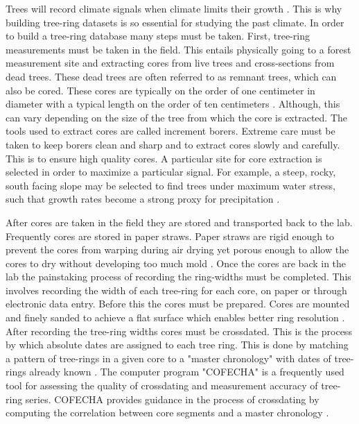 \documentclass[phd,tocprelim]{cornell}
\begin{document}

Trees will record climate signals when climate limits their 
growth \cite{fritts1976}. This is why building tree-ring datasets 
is so essential for studying the past climate. In order to build 
a tree-ring database many steps must be taken. First, tree-ring 
measurements must be taken in the field. This entails physically 
going to a forest measurement site and extracting cores from live 
trees and cross-sections from dead trees. These dead trees are often 
referred to as remnant trees, which can also be cored. These cores are 
typically on the order of one centimeter in diameter with a typical 
length on the order of ten centimeters \cite{vroblesky2008user}. 
Although, this can vary depending on the size of the tree from which 
the core is extracted. The tools used to extract cores are called 
increment borers. Extreme care must be taken to keep borers clean and 
sharp and to extract cores slowly and carefully. This is to ensure high 
quality cores. A particular site for core extraction is selected in 
order to maximize a particular signal. For example, a steep, rocky, 
south facing slope may be selected to find trees under maximum water 
stress, such that growth rates become a strong proxy for precipitation 
\cite{grissino1997,cook2013methods}. 

\par
After cores are taken in the field they are stored and transported 
back to the lab. Frequently cores are stored in paper straws. Paper 
straws are rigid enough to prevent the cores from warping during air 
drying yet porous enough to allow the cores to dry without developing 
too much mold \cite{phipps1985collecting}. Once the cores are back in 
the lab the painstaking process of recording the ring-widths must be 
completed. This involves recording the width of each tree-ring for 
each core, on paper or through electronic data entry. Before this the 
cores must be prepared. Cores are mounted and finely sanded to achieve 
a flat surface which enables better ring resolution 
\cite{phipps1985collecting}.
After recording the tree-ring widths cores must be crossdated. This 
is the process by which absolute dates are assigned to each tree ring. 
This is done by matching a pattern of tree-rings in a given core to a 
"master chronology" with dates of tree-rings already known 
\cite{phipps1985collecting}. The computer program "COFECHA" is a 
frequently used tool for assessing the quality of crossdating and 
measurement accuracy of tree-ring series. COFECHA provides guidance 
in the process of crossdating by computing the correlation between 
core segments and a master chronology \cite{grissino2000}.
\end{document}
